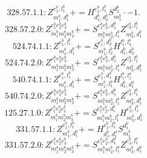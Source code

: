 \documentclass[letterpaper,10pt,fleqn,leqno,onecolumn]{article}
\begin{document}
\begin{equation} \;\;\;\;\;\;  328.57.1.1: Z^{e_{1}^{b},l_{1}^{b}}_{m_{1}^{b},d_{1}^{b}}+=H^{e_{1}^{b},l_{1}^{b}}_{d_{1}^{b},d_{2}^{b}}S^{d_{2}^{b}}_{m_{1}^{b}}\cdot -1. \end{equation}
\begin{equation} \;\;\;\;\;\;  328.57.2.0: Z^{e_{1}^{b}e_{2}^{b}e_{3}^{b}}_{m_{1}^{b}m_{2}^{b}m_{3}^{b}}+=S^{e_{1}^{b}e_{2}^{b},d_{1}^{b}}_{m_{1}^{b}m_{2}^{b},l_{1}^{b}}Z^{e_{3}^{b},l_{1}^{b}}_{m_{3}^{b},d_{1}^{b}} \end{equation}
\begin{equation} \;\;\;\;\;\;  524.74.1.1: Z^{e_{1}^{b},l_{1}^{b}}_{m_{1}^{b},d_{1}^{b}}+=S^{e_{1}^{b},d_{2}^{b}}_{m_{1}^{b},l_{2}^{b}}H^{l_{1}^{b},l_{2}^{b}}_{d_{1}^{b},d_{2}^{b}} \end{equation}
\begin{equation} \;\;\;\;\;\;  524.74.2.0: Z^{e_{1}^{b}e_{2}^{b}e_{3}^{b}}_{m_{1}^{b}m_{2}^{b}m_{3}^{b}}+=S^{e_{1}^{b}e_{2}^{b},d_{1}^{b}}_{m_{1}^{b}m_{2}^{b},l_{1}^{b}}Z^{e_{3}^{b},l_{1}^{b}}_{m_{3}^{b},d_{1}^{b}} \end{equation}
\begin{equation} \;\;\;\;\;\;  540.74.1.1: Z^{e_{1}^{b},l_{1}^{b}}_{m_{1}^{b},d_{1}^{b}}+=S^{e_{1}^{b},d_{1}^{a}}_{m_{1}^{b},l_{1}^{a}}H^{l_{1}^{b},l_{1}^{a}}_{d_{1}^{b},d_{1}^{a}} \end{equation}
\begin{equation} \;\;\;\;\;\;  540.74.2.0: Z^{e_{1}^{b}e_{2}^{b}e_{3}^{b}}_{m_{1}^{b}m_{2}^{b}m_{3}^{b}}+=S^{e_{1}^{b}e_{2}^{b},d_{1}^{b}}_{m_{1}^{b}m_{2}^{b},l_{1}^{b}}Z^{e_{3}^{b},l_{1}^{b}}_{m_{3}^{b},d_{1}^{b}} \end{equation}
\begin{equation} \;\;\;\;\;\;  125.27.1.0: Z^{e_{1}^{b}e_{2}^{b}e_{3}^{b}}_{m_{1}^{b}m_{2}^{b}m_{3}^{b}}+=S^{e_{1}^{b}e_{2}^{b},d_{1}^{b}}_{m_{1}^{b}m_{2}^{b},l_{1}^{b}}H^{e_{3}^{b},l_{1}^{b}}_{m_{3}^{b},d_{1}^{b}} \end{equation}
\begin{equation} \;\;\;\;\;\;  331.57.1.1: Z^{e_{1}^{b},l_{1}^{a}}_{m_{1}^{b},d_{1}^{a}}+=H^{e_{1}^{b},l_{1}^{a}}_{d_{1}^{b},d_{1}^{a}}S^{d_{1}^{b}}_{m_{1}^{b}} \end{equation}
\begin{equation} \;\;\;\;\;\;  331.57.2.0: Z^{e_{1}^{b}e_{2}^{b}e_{3}^{b}}_{m_{1}^{b}m_{2}^{b}m_{3}^{b}}+=S^{e_{1}^{b}e_{2}^{b},d_{1}^{a}}_{m_{1}^{b}m_{2}^{b},l_{1}^{a}}Z^{e_{3}^{b},l_{1}^{a}}_{m_{3}^{b},d_{1}^{a}} \end{equation}
\end{document}

